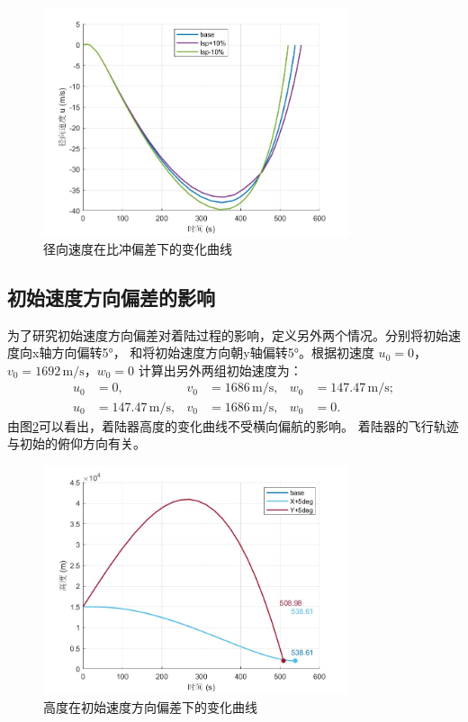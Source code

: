 \documentclass[12pt,a4paper]{article}
\begin{document}
\begin{figure}[H]
\centering
\includegraphics[width=0.8\textwidth]{figures/u_Isp.jpg}
\caption{径向速度在比冲偏差下的变化曲线}
\label{fig:uIsp}
\end{figure}

\subsection{初始速度方向偏差的影响}

为了研究初始速度方向偏差对着陆过程的影响，定义另外两个情况。分别将初始速度向x轴方向偏转5°，
和将初始速度方向朝y轴偏转5°。根据初速度 \( u_0=0 \)，\( v_0=1692 \, \text{m/s} \)，\( w_0=0 \) 
计算出另外两组初始速度为：
\begin{align*}
u_0 &= 0, & v_0 &= 1686 \, \text{m/s}, & w_0 &= 147.47 \, \text{m/s}; \\
u_0 &= 147.47 \, \text{m/s}, & v_0 &= 1686 \, \text{m/s}, & w_0 &= 0.
\end{align*}
由图\ref{fig:altv}可以看出，着陆器高度的变化曲线不受横向偏航的影响。
着陆器的飞行轨迹与初始的俯仰方向有关。

\begin{figure}[H]
\centering
\includegraphics[width=0.8\textwidth]{figures/altitude_VelDir.jpg}
\caption{高度在初始速度方向偏差下的变化曲线}
\label{fig:altv}
\end{figure}
\end{document}

